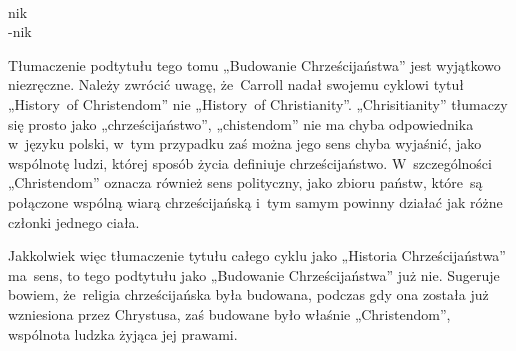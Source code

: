 \documentclass[a4paper,11pt]{article}
\begin{document}
\noindent
{} \\
\Jest \hspace{5pt} nik \\
\Powin -nik \\

\vspace{\spaceTwo}













\start Tłumaczenie podtytułu tego tomu „Budowanie Chrześcijaństwa”
jest wyjątkowo niezręczne. Należy zwrócić uwagę, że~Carroll nadał
swojemu cyklowi tytuł „History~of Christendom” nie „History~of
Christianity”. „Chrisitianity” tłumaczy się prosto jako
„chrześcijaństwo”, „chistendom” nie ma chyba odpowiednika w~języku
polski, w~tym przypadku zaś można jego sens chyba wyjaśnić, jako
wspólnotę ludzi, której sposób życia definiuje chrześcijaństwo.
W~szczególności „Christendom” oznacza również sens polityczny, jako
zbioru państw, które~są połączone wspólną wiarą chrześcijańską i~tym
samym powinny działać jak różne członki jednego ciała.

Jakkolwiek więc tłumaczenie tytułu całego cyklu jako „Historia
Chrześcijaństwa” ma~sens, to tego podtytułu jako „Budowanie
Chrześcijaństwa” już nie. Sugeruje bowiem, że~religia chrześcijańska
była budowana, podczas gdy ona została już wzniesiona przez Chrystusa,
zaś budowane było właśnie „Christendom”, wspólnota ludzka żyjąca jej
prawami.

\vspace{\spaceFour}


\start {}




\end{document}

